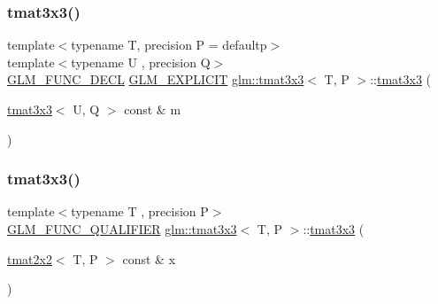 \mbox{\label{structglm_1_1tmat3x3_a7c44285c419a7485e7e558ee66c2a147}} 
\subsubsection{\texorpdfstring{tmat3x3()}{tmat3x3()}\hspace{0.1cm}{\footnotesize\ttfamily [10/22]}}
{\footnotesize\ttfamily template$<$typename T, precision P = defaultp$>$ \\
template$<$typename U , precision Q$>$ \\
\mbox{\hyperlink{setup_8hpp_ab2d052de21a70539923e9bcbf6e83a51}{G\+L\+M\+\_\+\+F\+U\+N\+C\+\_\+\+D\+E\+CL}} \mbox{\hyperlink{setup_8hpp_a6c74f5a5e7b134ab69023ff9a30d4d5d}{G\+L\+M\+\_\+\+E\+X\+P\+L\+I\+C\+IT}} \mbox{\hyperlink{structglm_1_1tmat3x3}{glm\+::tmat3x3}}$<$ T, P $>$\+::\mbox{\hyperlink{structglm_1_1tmat3x3}{tmat3x3}} (\begin{DoxyParamCaption}\item[{\mbox{\hyperlink{structglm_1_1tmat3x3}{tmat3x3}}$<$ U, Q $>$ const \&}]{m }\end{DoxyParamCaption})}

\mbox{\label{structglm_1_1tmat3x3_ae07ead4a125f21a8be9c423c09434f93}} 
\subsubsection{\texorpdfstring{tmat3x3()}{tmat3x3()}\hspace{0.1cm}{\footnotesize\ttfamily [11/22]}}
{\footnotesize\ttfamily template$<$typename T , precision P$>$ \\
\mbox{\hyperlink{setup_8hpp_a33fdea6f91c5f834105f7415e2a64407}{G\+L\+M\+\_\+\+F\+U\+N\+C\+\_\+\+Q\+U\+A\+L\+I\+F\+I\+ER}} \mbox{\hyperlink{structglm_1_1tmat3x3}{glm\+::tmat3x3}}$<$ T, P $>$\+::\mbox{\hyperlink{structglm_1_1tmat3x3}{tmat3x3}} (\begin{DoxyParamCaption}\item[{\mbox{\hyperlink{structglm_1_1tmat2x2}{tmat2x2}}$<$ T, P $>$ const \&}]{x }\end{DoxyParamCaption})}



